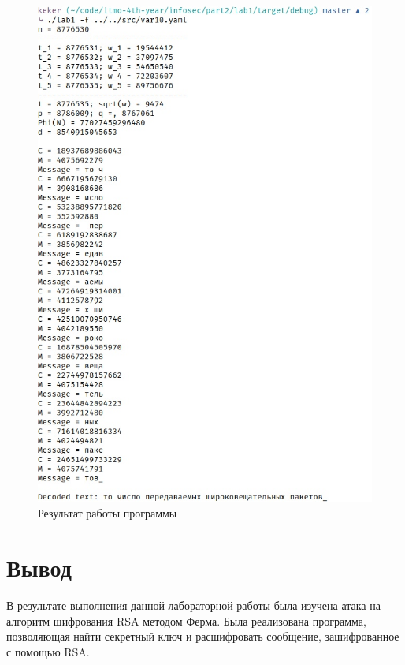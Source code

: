 \documentclass[12pt, a4paper]{article}
\begin{document}
\begin{figure}[H]
    \includegraphics[scale = 0.5]{res}
    \caption{Результат работы программы}
    \centering
\end{figure}

\section*{Вывод}

В результате выполнения данной лабораторной работы была изучена атака на
алгоритм шифрования RSA методом Ферма. Была реализована программа, позволяющая
найти секретный ключ и расшифровать сообщение, зашифрованное с помощью RSA.
\end{document}
